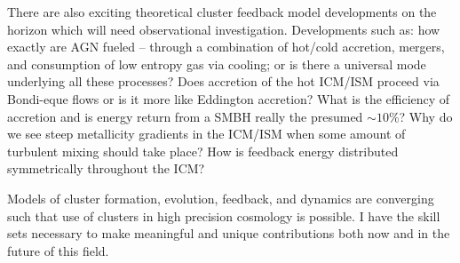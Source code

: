 \documentclass[11pt]{article}
\begin{document}
There are also exciting theoretical cluster feedback model
developments on the horizon which will need observational
investigation. Developments such as: how exactly are AGN fueled --
through a combination of hot/cold accretion, mergers, and consumption
of low entropy gas via cooling; or is there a universal mode
underlying all these processes? Does accretion of the hot ICM/ISM
proceed via Bondi-eque flows or is it more like Eddington accretion?
What is the efficiency of accretion and is energy return from a SMBH
really the presumed $\sim 10\%$? Why do we see steep metallicity
gradients in the ICM/ISM when some amount of turbulent mixing should
take place? How is feedback energy distributed symmetrically
throughout the ICM?

Models of cluster formation, evolution, feedback, and dynamics are
converging such that use of clusters in high precision cosmology is
possible. I have the skill sets necessary to make meaningful and
unique contributions both now and in the future of this field.
\end{document}
